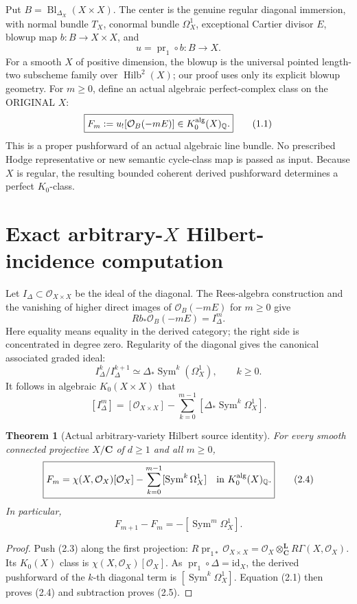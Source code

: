 \documentclass[11pt]{article}
\newcommand{\Q}{\mathbb Q}
\newcommand{\Sym}{\operatorname{Sym}}
\newcommand{\Hilb}{\operatorname{Hilb}}
\newtheorem{theorem}{Theorem}[section]
\begin{document}
Put \(B=\operatorname{Bl}_{\Delta_X}(X\times X)\).
The center is the genuine regular diagonal immersion, with
normal bundle \(T_X\), conormal bundle \(\Omega_X^1\), exceptional
Cartier divisor \(E\), blowup map \(b:B\to X\times X\), and
\[
              u=\operatorname{pr}_1\circ b:B\to X.
\]
For a smooth \(X\) of positive dimension, the blowup is the
universal pointed length-two subscheme family over
\(\Hilb^2(X)\); our proof uses only its explicit blowup geometry.
For \(m\geq0\), define an actual algebraic perfect-complex
class on the ORIGINAL \(X\):
\[
 \boxed{F_m:=u_![\mathcal O_B(-mE)]
           \in K_0^{\rm alg}(X)_{\Q}.}              \tag{1.1}
\]
This is a proper pushforward of an actual algebraic line bundle.
No prescribed Hodge representative or new semantic cycle-class map
is passed as input. Because \(X\) is regular, the resulting bounded
coherent derived pushforward determines a perfect \(K_0\)-class.

\section{Exact arbitrary-\(X\) Hilbert-incidence computation}
Let \(I_\Delta\subset\mathcal O_{X\times X}\) be the ideal of the
diagonal. The Rees-algebra construction and the vanishing of higher
direct images of \(\mathcal O_B(-mE)\) for \(m\geq0\) give
\[
 Rb_*\mathcal O_B(-mE)=I_\Delta^m.
                                                               \tag{2.1}
\]
Here equality means equality in the derived category; the right
side is concentrated in degree zero. Regularity of the diagonal gives
the canonical associated graded ideal:
\[
 I_\Delta^k/I_\Delta^{k+1}
       \simeq \Delta_*\Sym^k(\Omega_X^1),\qquad k\geq0.
                                                               \tag{2.2}
\]
It follows in algebraic \(K_0(X\times X)\) that
\[
 [I_\Delta^m]=[\mathcal O_{X\times X}]
       -\sum_{k=0}^{m-1}
          [\Delta_*\Sym^k\Omega_X^1].              \tag{2.3}
\]

\begin{theorem}[Actual arbitrary-variety Hilbert source identity]
For every smooth connected projective \(X/\mathbf C\)
of \(d\geq1\) and all \(m\geq0\),
\[
 \boxed{
 F_m=\chi(X,\mathcal O_X)[\mathcal O_X]
       -\sum_{k=0}^{m-1}[\Sym^k\Omega_X^1]
 \quad\text{in }K_0^{\rm alg}(X)_{\Q}.}            \tag{2.4}
\]
In particular,
\[
 F_{m+1}-F_m=-[\Sym^m\Omega_X^1].                  \tag{2.5}
\]
\end{theorem}
\begin{proof}
Push (2.3) along the first projection:
\(
 R\operatorname{pr}_{1*}\mathcal O_{X\times X}
   =\mathcal O_X\otimes_{\mathbf C}^{\mathbf L}
       R\Gamma(X,\mathcal O_X)
\).
Its \(K_0(X)\) class is \(\chi(X,\mathcal O_X)[\mathcal O_X]\).
As \(\operatorname{pr}_1\circ\Delta=\mathrm{id}_X\),
the derived pushforward of the \(k\)-th diagonal term is
\([\Sym^k\Omega_X^1]\). Equation (2.1) then proves (2.4)
and subtraction proves (2.5).
\end{proof}
\end{document}
